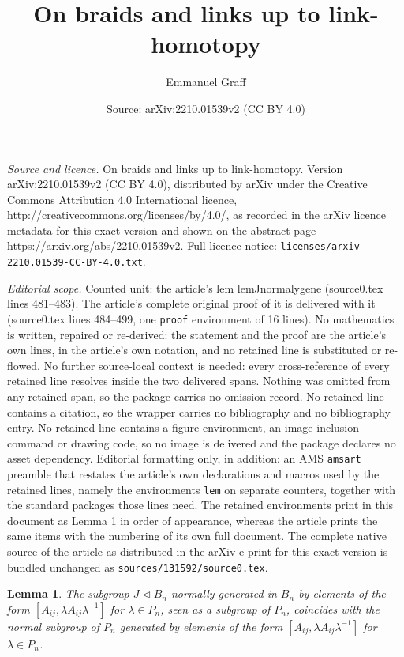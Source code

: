 \documentclass[10pt,a4paper]{amsart}
\title{On braids and links up to link-homotopy}
\author{Emmanuel Graff}
\date{Source: arXiv:2210.01539v2 (CC BY 4.0)}
\newtheorem{lem}{Lemma}
\begin{document}
\maketitle

\noindent\emph{Source and licence.} On braids and links up to link-homotopy. Version arXiv:2210.01539v2 (CC BY 4.0), distributed by arXiv under the Creative Commons Attribution 4.0 International licence, http://creativecommons.org/licenses/by/4.0/, as recorded in the arXiv licence metadata for this exact version and shown on the abstract page https://arxiv.org/abs/2210.01539v2. Full licence notice: \texttt{licenses/arxiv-2210.01539-CC-BY-4.0.txt}.\par\smallskip

\noindent\textit{Editorial scope.} Counted unit: the article's lem lemJnormalygene (source0.tex lines 481--483). The article's complete original proof of it is delivered with it (source0.tex lines 484--499, one \texttt{proof} environment of 16 lines). No mathematics is written, repaired or re-derived: the statement and the proof are the article's own lines, in the article's own notation, and no retained line is substituted or re-flowed.  No further source-local context is needed: every cross-reference of every retained line resolves inside the two delivered spans.  Nothing was omitted from any retained span, so the package carries no omission record.  No retained line contains a citation, so the wrapper carries no bibliography and no bibliography entry.  No retained line contains a figure environment, an image-inclusion command or drawing code, so no image is delivered and the package declares no asset dependency.  Editorial formatting only, in addition: an AMS \texttt{amsart} preamble that restates the article's own declarations and macros used by the retained lines, namely the environments \texttt{lem} on separate counters, together with the standard packages those lines need.  The retained environments print in this document as Lemma 1 in order of appearance, whereas the article prints the same items with the numbering of its own full document.  The complete native source of the article as distributed in the arXiv e-print for this exact version is bundled unchanged as \texttt{sources/131592/source0.tex}.
\begin{lem}\label{lemJnormalygene}
The subgroup $J\triangleleft B_n$ normally generated in $B_n$ by elements of the form $[A_{ij},\lambda A_{ij} \lambda^{-1}]$ for $\lambda\in P_n$, seen as a subgroup of $P_n$, coincides with the normal subgroup of $P_n$ generated by elements of the form  $[A_{ij},\lambda A_{ij} \lambda^{-1}]$ for $\lambda\in P_n$.
\end{lem}
\end{document}
